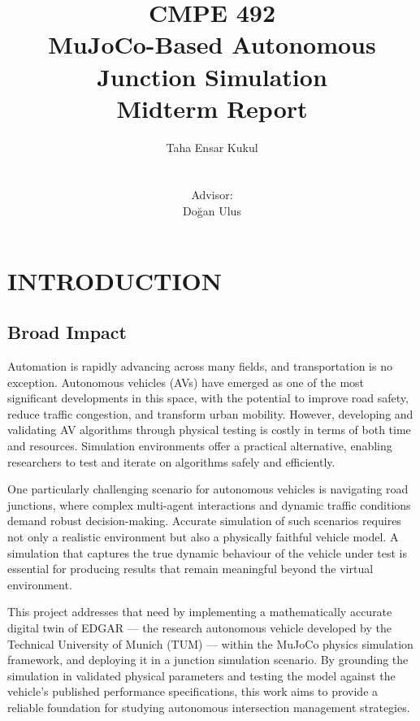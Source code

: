 \documentclass[a4paper,12pt]{report}
\begin{document}
\title{CMPE 492 \\ MuJoCo-Based Autonomous Junction Simulation \\ \large Midterm Report}
\author{
Taha Ensar Kukul\\
\\ \\
Advisor: \\
Doğan Ulus
}
\date{}
\maketitle{}
\tableofcontents

\chapter{INTRODUCTION}

\section{Broad Impact}

Automation is rapidly advancing across many fields, and transportation is no
exception. Autonomous vehicles (AVs) have emerged as one of the most significant
developments in this space, with the potential to improve road safety, reduce
traffic congestion, and transform urban mobility. However, developing and
validating AV algorithms through physical testing is costly in terms of both
time and resources. Simulation environments offer a practical alternative,
enabling researchers to test and iterate on algorithms safely and efficiently.

One particularly challenging scenario for autonomous vehicles is navigating road
junctions, where complex multi-agent interactions and dynamic traffic conditions
demand robust decision-making. Accurate simulation of such scenarios requires
not only a realistic environment but also a physically faithful vehicle model.
A simulation that captures the true dynamic behaviour of the vehicle under test
is essential for producing results that remain meaningful beyond the virtual
environment.

This project addresses that need by implementing a mathematically accurate
digital twin of EDGAR — the research autonomous vehicle developed by the
Technical University of Munich (TUM) — within the MuJoCo physics simulation
framework, and deploying it in a junction simulation scenario. By grounding the
simulation in validated physical parameters and testing the model against the
vehicle's published performance specifications, this work aims to provide a
reliable foundation for studying autonomous intersection management strategies.
\end{document}
